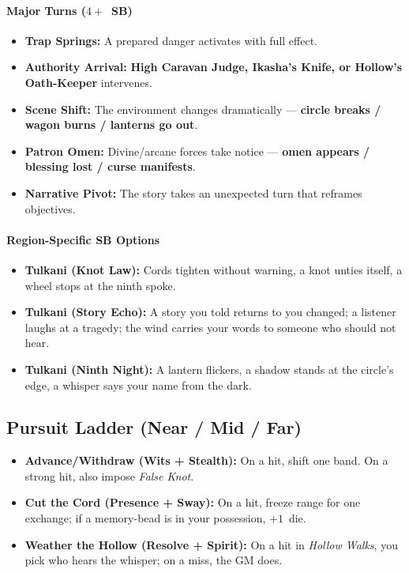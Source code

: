 \paragraph{Major Turns ($4+$~SB)}
\begin{itemize}
\item \textbf{Trap Springs:} A prepared danger activates with full effect.
\item \textbf{Authority Arrival:} \textbf{High Caravan Judge, Ikasha's Knife, or Hollow's Oath-Keeper} intervenes.
\item \textbf{Scene Shift:} The environment changes dramatically --- \textbf{circle breaks / wagon burns / lanterns go out}.
\item \textbf{Patron Omen:} Divine/arcane forces take notice --- \textbf{omen appears / blessing lost / curse manifests}.
\item \textbf{Narrative Pivot:} The story takes an unexpected turn that reframes objectives.
\end{itemize}

\paragraph{Region-Specific SB Options}
\begin{itemize}
\item \textbf{Tulkani (Knot Law):} Cords tighten without warning, a knot unties itself, a wheel stops at the ninth spoke.
\item \textbf{Tulkani (Story Echo):} A story you told returns to you changed; a listener laughs at a tragedy; the wind carries your words to someone who should not hear.
\item \textbf{Tulkani (Ninth Night):} A lantern flickers, a shadow stands at the circle's edge, a whisper says your name from the dark.
\end{itemize}

\subsection*{Pursuit Ladder (Near / Mid / Far)}
\begin{itemize}
\item \textbf{Advance/Withdraw (Wits + Stealth):} On a hit, shift one band. On a strong hit, also impose \emph{False Knot}.
\item \textbf{Cut the Cord (Presence + Sway):} On a hit, freeze range for one exchange; if a memory-bead is in your possession, $+1$~die.
\item \textbf{Weather the Hollow (Resolve + Spirit):} On a hit in \emph{Hollow Walks}, you pick who hears the whisper; on a miss, the GM does.
\end{itemize}

